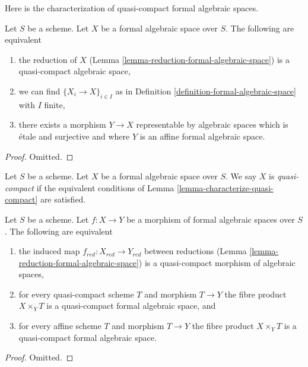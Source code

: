\noindent
Here is the characterization of quasi-compact formal algebraic
spaces.

\begin{lemma}
\label{lemma-characterize-quasi-compact}
Let $S$ be a scheme. Let $X$ be a formal algebraic space over $S$.
The following are equivalent
\begin{enumerate}
\item the reduction of $X$
(Lemma \ref{lemma-reduction-formal-algebraic-space}) is a quasi-compact
algebraic space,
\item we can find $\{X_i \to X\}_{i \in I}$ as in
Definition \ref{definition-formal-algebraic-space} with $I$ finite,
\item there exists a morphism $Y \to X$ representable by algebraic
spaces which is \'etale and surjective and where
$Y$ is an affine formal algebraic space.
\end{enumerate}
\end{lemma}

\begin{proof}
Omitted.
\end{proof}

\begin{definition}
\label{definition-quasi-compact}
Let $S$ be a scheme. Let $X$ be a formal algebraic space over $S$.
We say $X$ is {\it quasi-compact} if the equivalent conditions of
Lemma \ref{lemma-characterize-quasi-compact} are satisfied.
\end{definition}

\begin{lemma}
\label{lemma-characterize-quasi-compact-morphism}
Let $S$ be a scheme. Let $f : X \to Y$ be a morphism of formal algebraic
spaces over $S$. The following are equivalent
\begin{enumerate}
\item the induced map $f_{red} : X_{red} \to Y_{red}$ between reductions
(Lemma \ref{lemma-reduction-formal-algebraic-space}) is a quasi-compact
morphism of algebraic spaces,
\item for every quasi-compact scheme $T$ and morphism $T \to Y$
the fibre product $X \times_Y T$ is a quasi-compact formal
algebraic space, and
\item for every affine scheme $T$ and morphism $T \to Y$
the fibre product $X \times_Y T$ is a quasi-compact formal
algebraic space.
\end{enumerate}
\end{lemma}

\begin{proof}
Omitted.
\end{proof}

